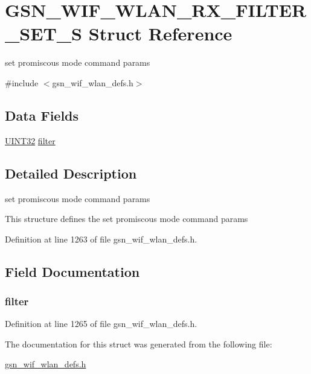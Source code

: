 \hypertarget{a00397}{
\section{GSN\_\-WIF\_\-WLAN\_\-RX\_\-FILTER\_\-SET\_\-S Struct Reference}
\label{a00397}
}


set promiscous mode command params  




{\ttfamily \#include $<$gsn\_\-wif\_\-wlan\_\-defs.h$>$}

\subsection*{Data Fields}
\begin{DoxyCompactItemize}
\item 
\hyperlink{a00660_gae1e6edbbc26d6fbc71a90190d0266018}{UINT32} \hyperlink{a00397_ac78f11d2eba93cb4f7bb563eea19e872}{filter}
\end{DoxyCompactItemize}


\subsection{Detailed Description}
set promiscous mode command params 

This structure defines the set promiscous mode command params 

Definition at line 1263 of file gsn\_\-wif\_\-wlan\_\-defs.h.



\subsection{Field Documentation}
\hypertarget{a00397_ac78f11d2eba93cb4f7bb563eea19e872}{
\subsubsection[{filter}]{ {\bf filter}}}
\label{a00397_ac78f11d2eba93cb4f7bb563eea19e872}


Definition at line 1265 of file gsn\_\-wif\_\-wlan\_\-defs.h.



The documentation for this struct was generated from the following file:\begin{DoxyCompactItemize}
\item 
\hyperlink{a00613}{gsn\_\-wif\_\-wlan\_\-defs.h}\end{DoxyCompactItemize}
